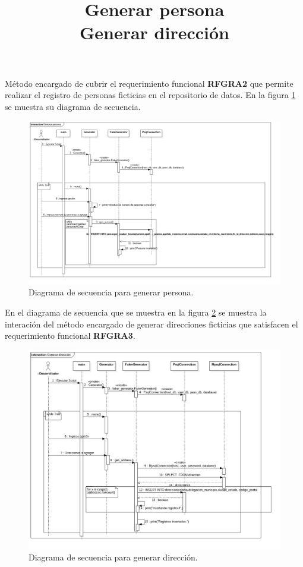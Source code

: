 \title{\textbf{Generar persona\\}}
Método encargado de cubrir el requerimiento funcional \textbf{RFGRA2} que permite realizar el registro de personas ficticias en el repositorio de datos. En la figura \ref{image:DSgenerarPersona} se muestra su diagrama de secuencia. 
\FloatBarrier
\begin{figure}[htbp!]
		\centering
			\includegraphics[width=1.1 \textwidth]{imagenes/DSRuben/gen_person_generator}
		\caption{Diagrama de secuencia para generar persona.}
		\label{image:DSgenerarPersona}
\end{figure}
\FloatBarrier





\title{\textbf{Generar dirección\\}}
En el diagrama de secuencia que se muestra en la figura \ref{image:DSgenerarDireccion} se muestra la interación del método encargado de generar direcciones ficticias que satisfacen el requerimiento funcional \textbf{RFGRA3}.
\FloatBarrier
\begin{figure}[htbp!]
		\centering
			\includegraphics[width=1.1 \textwidth]{imagenes/DSRuben/gen_address_generator}
		\caption{Diagrama de secuencia para generar dirección.}
		\label{image:DSgenerarDireccion}
\end{figure}
\FloatBarrier








